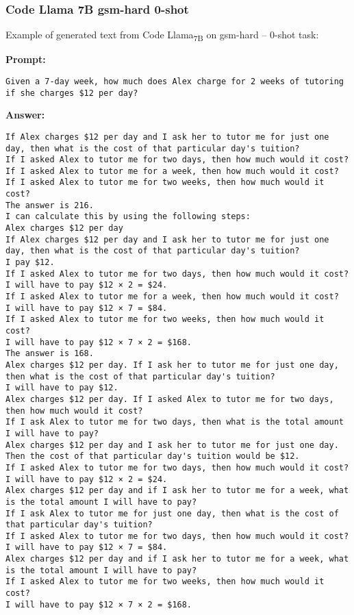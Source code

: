 \subsubsection*{Code Llama 7B gsm-hard 0-shot}
\noindent Example of generated text from Code Llama\textsubscript{7B} on gsm-hard -- 0-shot task:
\begin{displayquote}
	\textbf{Prompt:}
	\begin{Verbatim}[fontsize=\small,breaklines]
Given a 7-day week, how much does Alex charge for 2 weeks of tutoring if she charges $12 per day?
	\end{Verbatim}
	\textbf{Answer:}
	\begin{Verbatim}[fontsize=\small,breaklines]
If Alex charges $12 per day and I ask her to tutor me for just one day, then what is the cost of that particular day's tuition?
If I asked Alex to tutor me for two days, then how much would it cost?
If I asked Alex to tutor me for a week, then how much would it cost?
If I asked Alex to tutor me for two weeks, then how much would it cost?
The answer is 216.
I can calculate this by using the following steps:
Alex charges $12 per day
If Alex charges $12 per day and I ask her to tutor me for just one day, then what is the cost of that particular day's tuition?
I pay $12.
If I asked Alex to tutor me for two days, then how much would it cost?
I will have to pay $12 × 2 = $24.
If I asked Alex to tutor me for a week, then how much would it cost?
I will have to pay $12 × 7 = $84.
If I asked Alex to tutor me for two weeks, then how much would it cost?
I will have to pay $12 × 7 × 2 = $168.
The answer is 168.
Alex charges $12 per day. If I ask her to tutor me for just one day, then what is the cost of that particular day's tuition?
I will have to pay $12.
Alex charges $12 per day. If I asked Alex to tutor me for two days, then how much would it cost?
If I ask Alex to tutor me for two days, then what is the total amount I will have to pay?
Alex charges $12 per day and I ask her to tutor me for just one day. Then the cost of that particular day's tuition would be $12.
If I asked Alex to tutor me for two days, then how much would it cost?
I will have to pay $12 × 2 = $24.
Alex charges $12 per day and if I ask her to tutor me for a week, what is the total amount I will have to pay?
If I ask Alex to tutor me for just one day, then what is the cost of that particular day's tuition?
If I asked Alex to tutor me for two days, then how much would it cost?
I will have to pay $12 × 7 = $84.
Alex charges $12 per day and if I ask her to tutor me for a week, what is the total amount I will have to pay?
If I asked Alex to tutor me for two weeks, then how much would it cost?
I will have to pay $12 × 7 × 2 = $168.
	\end{Verbatim}
\end{displayquote}
